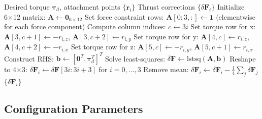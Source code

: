 \documentclass[12pt,a4paper]{article}
\begin{document}
\begin{algorithm}
\caption{Least-Squares Thrust Allocation with Zero Net Force}
\begin{algorithmic}[1]
\Require Desired torque $\boldsymbol{\tau}_d$, attachment points $\{\mathbf{r}_i\}$
\Ensure Thrust corrections $\{\delta\mathbf{F}_i\}$
\State Initialize 6×12 matrix: $\mathbf{A} \gets \mathbf{0}_{6 \times 12}$
\State Set force constraint rows: $\mathbf{A}[0:3, :] \gets \mathbf{1}$ (elementwise for each force component)
    \State Compute column indices: $c \gets 3i$
    \State Set torque row for x: $\mathbf{A}[3, c+1] \gets -r_{i,z}$, $\mathbf{A}[3, c+2] \gets r_{i,y}$
    \State Set torque row for y: $\mathbf{A}[4, c] \gets r_{i,z}$, $\mathbf{A}[4, c+2] \gets -r_{i,x}$
    \State Set torque row for z: $\mathbf{A}[5, c] \gets -r_{i,y}$, $\mathbf{A}[5, c+1] \gets r_{i,x}$
\EndFor
\State Construct RHS: $\mathbf{b} \gets [\mathbf{0}^T, \boldsymbol{\tau}_d^T]^T$
\State Solve least-squares: $\delta\mathbf{F} \gets \text{lstsq}(\mathbf{A}, \mathbf{b})$
\State Reshape to 4×3: $\delta\mathbf{F}_i \gets \delta\mathbf{F}[3i:3i+3]$ for $i=0,\ldots,3$
\State Remove mean: $\delta\mathbf{F}_i \gets \delta\mathbf{F}_i - \frac{1}{4}\sum_j \delta\mathbf{F}_j$
\State \Return $\{\delta\mathbf{F}_i\}$
\end{algorithmic}
\end{algorithm}

\newpage
\subsection{Configuration Parameters}
\end{document}
